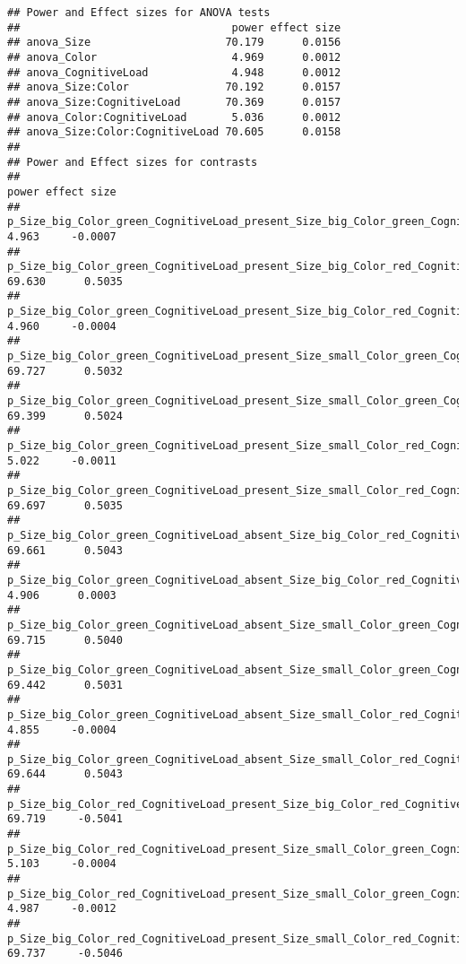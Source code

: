\documentclass[]{article}
\begin{document}
\begin{verbatim}
## Power and Effect sizes for ANOVA tests
##                                 power effect size
## anova_Size                     70.179      0.0156
## anova_Color                     4.969      0.0012
## anova_CognitiveLoad             4.948      0.0012
## anova_Size:Color               70.192      0.0157
## anova_Size:CognitiveLoad       70.369      0.0157
## anova_Color:CognitiveLoad       5.036      0.0012
## anova_Size:Color:CognitiveLoad 70.605      0.0158
## 
## Power and Effect sizes for contrasts
##                                                                                             power effect size
## p_Size_big_Color_green_CognitiveLoad_present_Size_big_Color_green_CognitiveLoad_absent      4.963     -0.0007
## p_Size_big_Color_green_CognitiveLoad_present_Size_big_Color_red_CognitiveLoad_present      69.630      0.5035
## p_Size_big_Color_green_CognitiveLoad_present_Size_big_Color_red_CognitiveLoad_absent        4.960     -0.0004
## p_Size_big_Color_green_CognitiveLoad_present_Size_small_Color_green_CognitiveLoad_present  69.727      0.5032
## p_Size_big_Color_green_CognitiveLoad_present_Size_small_Color_green_CognitiveLoad_absent   69.399      0.5024
## p_Size_big_Color_green_CognitiveLoad_present_Size_small_Color_red_CognitiveLoad_present     5.022     -0.0011
## p_Size_big_Color_green_CognitiveLoad_present_Size_small_Color_red_CognitiveLoad_absent     69.697      0.5035
## p_Size_big_Color_green_CognitiveLoad_absent_Size_big_Color_red_CognitiveLoad_present       69.661      0.5043
## p_Size_big_Color_green_CognitiveLoad_absent_Size_big_Color_red_CognitiveLoad_absent         4.906      0.0003
## p_Size_big_Color_green_CognitiveLoad_absent_Size_small_Color_green_CognitiveLoad_present   69.715      0.5040
## p_Size_big_Color_green_CognitiveLoad_absent_Size_small_Color_green_CognitiveLoad_absent    69.442      0.5031
## p_Size_big_Color_green_CognitiveLoad_absent_Size_small_Color_red_CognitiveLoad_present      4.855     -0.0004
## p_Size_big_Color_green_CognitiveLoad_absent_Size_small_Color_red_CognitiveLoad_absent      69.644      0.5043
## p_Size_big_Color_red_CognitiveLoad_present_Size_big_Color_red_CognitiveLoad_absent         69.719     -0.5041
## p_Size_big_Color_red_CognitiveLoad_present_Size_small_Color_green_CognitiveLoad_present     5.103     -0.0004
## p_Size_big_Color_red_CognitiveLoad_present_Size_small_Color_green_CognitiveLoad_absent      4.987     -0.0012
## p_Size_big_Color_red_CognitiveLoad_present_Size_small_Color_red_CognitiveLoad_present      69.737     -0.5046

\end{verbatim}
\end{document}
